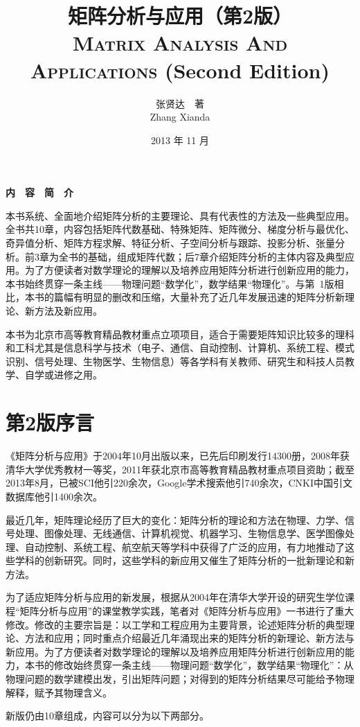\documentclass[punct=kaiming, fontset=sikou]{ctexbook}
\title{矩阵分析与应用（第2版）\\\textsc{Matrix Analysis And Applications} (Second Edition)}
\author{张贤达　著\\Zhang Xianda}
\date{2013 年 11 月}
\makeatletter
\numberwithin{equation}{section}
\newenvironment{abstract}{%
  \small%
  \begin{center}%
    {\bfseries 内　容　简　介}\vspace{-.5em}\vspace{\z@}%
  \end{center}\par}{\par}
\makeatother
\begin{document}
  \frontmatter
  \maketitle
  \begin{abstract}
    本书系统、全面地介绍矩阵分析的主要理论、具有代表性的方法及一些典型应用。全书共10章，内容包括矩阵代数基础、特殊矩阵、矩阵微分、梯度分析与最优化、奇异值分析、矩阵方程求解、特征分析、子空间分析与跟踪、投影分析、张量分析。前3章为全书的基础，组成矩阵代数；后7章介绍矩阵分析的主体内容及典型应用。为了方便读者对数学理论的理解以及培养应用矩阵分析进行创新应用的能力，本书始终贯穿一条主线——物理问题“数学化”，数学结果“物理化”。与第~1版相比，本书的篇幅有明显的删改和压缩，大量补充了近几年发展迅速的矩阵分析新理论、新方法及新应用。

    本书为北京市高等教育精品教材重点立项项目，适合于需要矩阵知识比较多的理科和工科尤其是信息科学与技术（电子、通信、自动控制、计算机、系统工程、模式识别、信号处理、生物医学、生物信息）等各学科有关教师、研究生和科技人员教学、自学或进修之用。
  \end{abstract}

  \chapter{第2版序言}
  《矩阵分析与应用》于2004年10月出版以来，已先后印刷发行14300册，2008年获清华大学优秀教材一等奖，2011年获北京市高等教育精品教材重点项目资助；截至2013年8月，已被SCI他引220余次，Google学术搜索他引740余次，CNKI中国引文数据库他引1400余次。

  最近几年，矩阵理论经历了巨大的变化：矩阵分析的理论和方法在物理、力学、信号处理、图像处理、无线通信、计算机视觉、机器学习、生物信息学、医学图像处理、自动控制、系统工程、航空航天等学科中获得了广泛的应用，有力地推动了这些学科的创新研究。同时，这些学科的新应用又催生了矩阵分析的一批新理论和新方法。

  为了适应矩阵分析与应用的新发展，根据从2004年在清华大学开设的研究生学位课程“矩阵分析与应用”的课堂教学实践，笔者对《矩阵分析与应用》一书进行了重大修改。修改的主要宗旨是：以工学和工程应用为主要背景，论述矩阵分析的典型理论、方法和应用；同时重点介绍最近几年涌现出来的矩阵分析的新理论、新方法与新应用。为了方便读者对数学理论的理解以及培养应用矩阵分析进行创新应用的能力，本书的修改始终贯穿一条主线——物理问题“数学化”，数学结果“物理化”：从物理问题的数学建模出发，引出矩阵问题；对得到的矩阵分析结果尽可能给予物理解释，赋予其物理含义。

  新版仍由10章组成，内容可以分为以下两部分。
\end{document}
